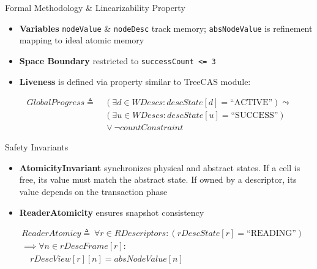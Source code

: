 \begin{frame}{Formal Methodology \& Linearizability Property}
    \begin{itemize}
        \item \textbf{Variables} \texttt{nodeValue} \& \texttt{nodeDesc} track memory; \texttt{absNodeValue} is refinement mapping to ideal atomic memory

        \item \textbf{Space Boundary} restricted to \texttt{successCount <= 3}

        \item \textbf{Liveness} is defined via property similar to TreeCAS module:
    \end{itemize}

    \begin{equation*}
    \begin{aligned}
GlobalProgress \triangleq & \ (\exists d \in WDescs : descState[d] = \text{``ACTIVE''}) \leadsto \\
                    & \ (\exists u \in WDescs : descState[u] = \text{``SUCCESS''}) \\
                    & \ \lor \neg countConstraint
    \end{aligned}
    \end{equation*}

\end{frame}


\begin{frame}{Safety Invariants}
    \begin{itemize}
        \item \textbf{AtomicityInvariant} synchronizes physical and abstract states. If a cell is free, its value must match the abstract state. If owned by a descriptor, its value depends on the transaction phase

        \item \textbf{ReaderAtomicity} ensures snapshot consistency
    \end{itemize}

    \begin{equation*}
    \begin{aligned}
    & ReaderAtomicy \triangleq \ \forall r \in RDescriptors : (rDescState[r] = \text{``READING''}) \\
    & \implies \forall n \in rDescFrame[r] : \\
    & \quad rDescView[r][n] = absNodeValue[n]
    \end{aligned}
    \end{equation*}

\end{frame}
